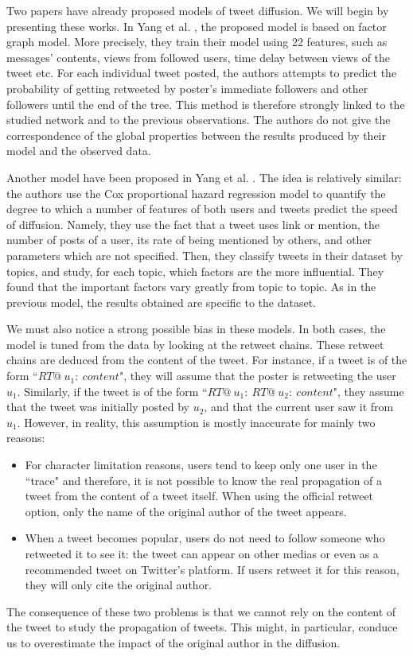 \documentclass[conference]{IEEEtran}
\begin{document}
Two papers have already proposed models of tweet diffusion. We will begin by presenting these works.
In Yang et al. \cite{yang2010understanding}, the proposed model is based on factor graph model. More precisely, they train their model using 22 features, such as messages' contents, views from followed users, time delay between views of the tweet etc. For each individual tweet posted, the authors attempts to predict the probability of getting retweeted by poster's immediate followers and other followers until the end of the tree. This method is therefore strongly linked to the studied network and to the previous observations. The authors do not give the correspondence of the global properties between the results produced by their model and the observed data.

Another model have been proposed in Yang et al. \cite{yang2010predicting}. The idea is relatively similar: the authors use the Cox proportional hazard regression model to quantify the degree to which a number of features of both users and tweets predict the speed of diffusion. Namely, they use the fact that a tweet uses link or mention, the number of posts of a user, its rate of being mentioned by others, and other parameters which are not specified. Then, they classify tweets in their dataset by topics, and study, for each topic, which factors are the more influential. They found that the important factors vary greatly from topic to topic. As in the previous model, the results obtained are specific to the dataset.

We must also notice a strong possible bias in these models. In both cases, the model is tuned from the data by looking at the retweet chains. These retweet chains are deduced from the content of the tweet. For instance, if a tweet is of the form ``$RT@~u_1:~content$", they will assume that the poster is retweeting the user $u_1$. Similarly, if the tweet is of the form ``$RT@~u_1:~RT@~u_2:~content$", they assume that the tweet was initially posted by $u_2$, and that the current user saw it from $u_1$. However, in reality, this assumption is mostly inaccurate for mainly two reasons:
\begin{itemize}
\item For character limitation reasons, users tend to keep only one user in the ``trace" and therefore, it is not possible to know the real propagation of a tweet from the content of a tweet itself. When using the official retweet option, only the name of the original author of the tweet appears.
\item When a tweet becomes popular, users do not need to follow someone who retweeted it to see it: the tweet can appear on other medias or even as a recommended tweet on Twitter's platform. If users retweet it for this reason, they will only cite the original author.
\end{itemize}
The consequence of these two problems is that we cannot rely on the content of the tweet to study the propagation of tweets. This might, in particular, conduce us to overestimate the impact of the original author in the diffusion.
\end{document}

